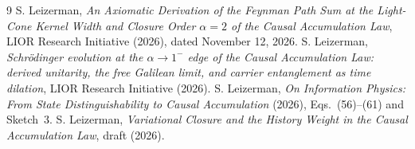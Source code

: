 \documentclass[10pt]{article}
\theoremstyle{definition}
\begin{document}
\begin{thebibliography}{9}\small
{} S. Leizerman, \emph{An Axiomatic Derivation of the Feynman Path Sum at the Light-Cone Kernel Width and Closure Order $\alpha=2$ of the Causal Accumulation Law}, LIOR Research Initiative (2026), dated November 12, 2026.
 S. Leizerman, \emph{Schr\"odinger evolution at the $\alpha\to1^-$ edge of the Causal Accumulation Law: derived unitarity, the free Galilean limit, and carrier entanglement as time dilation}, LIOR Research Initiative (2026).
 S. Leizerman, \emph{On Information Physics: From State Distinguishability to Causal Accumulation} (2026), Eqs.~(56)--(61) and Sketch~3.
 S. Leizerman, \emph{Variational Closure and the History Weight in the Causal Accumulation Law}, draft (2026).
\end{thebibliography}
\end{document}

